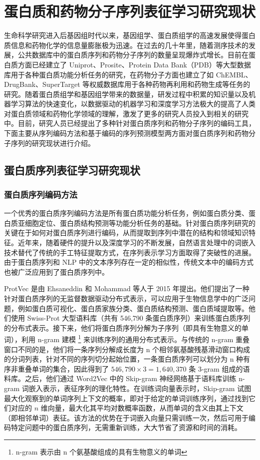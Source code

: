 
\chapter{蛋白质和药物分子序列表征学习研究现状}

生命科学研究进入后基因组时代以来，基因组学、蛋白质组学的高速发展使得蛋白质信息和药物化学的信息量膨胀极为迅速。在过去的几十年里，随着测序技术的发展，公共数据库中的蛋白质序列和药物分子序列的数量呈现爆炸式增长。目前在蛋白质方面已经建立了 Uniprot、Prosite、Protein Data Bank（PDB）等大型数据库用于各种蛋白质功能分析任务的研究，在药物分子方面也建立了如 ChEMBL、DrugBank、SuperTarget 等权威数据库用于各种药物再利用和药物生成等任务的研究。随着蛋白质组学和基因组学带来的数据量，研发过程中积累的知识量以及机器学习算法的快速变化，以数据驱动的机器学习和深度学习方法极大的提高了人类对蛋白质领域和药物化学领域的理解，激发了更多的研究人员投入到相关的研究中。目前，研究人员已经提出了多种针对蛋白质序列和药物分子序列的编码工具，下面主要从序列编码方法和基于编码的序列预测模型两方面对蛋白质序列和药物分子序列的研究现状进行介绍。

\section{蛋白质序列表征学习研究现状}

\subsection{蛋白质序列编码方法}
一个优秀的蛋白质序列编码方法是所有蛋白质功能分析任务，例如蛋白质分类、蛋白质亚细胞定位、蛋白质结构预测等功能分析任务的基础。针对蛋白质序列研究的关键在于如何对蛋白质序列进行编码，从而提取到序列中潜在的结构和领域知识特征。近年来，随着硬件的提升以及深度学习的不断发展，自然语言处理中的词嵌入技术替代了传统的手工特征提取方式，在序列表示学习方面取得了突破性的进展。由于蛋白质序列和 NLP 中的文本序列存在一定的相似性，传统文本中的编码方式也被广泛应用到了蛋白质序列中。

ProtVec \cite{asgari2015continuous} 是由 Ehsaneddin 和 Mohammad 等人于 2015 年提出。他们提出了一种针对蛋白质序列的无监督数据驱动分布式表示，可以应用于生物信息学中的广泛问题，例如蛋白质可视化、蛋白质家族分类、蛋白质结构预测、蛋白质域提取等。他们使用 Swiss-Prot 大型语料库（共有 546,790 条蛋白质序列）来训练蛋白质序列的分布式表示。接下来，他们将蛋白质序列分解为子序列（即具有生物意义的单词），利用 n-gram 建模 \footnote{n-gram 表示由 n 个氨基酸组成的具有生物意义的单词} 来训练序列的通用分布式表示。与传统的 n-gram 重叠窗口不同的是，他们将一条序列分解成长度为 n 个相邻氨基酸残基滑动窗口构成的分词列表，针对不同的序列切分起始位置，一条蛋白质序列可以划分为 n 种有序非重叠单词的集合，因此得到了 $546,790 \times 3 = 1,640,370$ 条 3-gram 组成的语料库。之后，他们通过 Word2Vec \cite{mikolov2013distributed} 中的 Skip-gram 神经网络基于语料库训练 n-gram 词嵌入表示，表征序列的理化特性。在训练词向量表示时，Skip-gram 试图最大化观察到的单词序列上下文的概率，即对于给定的单词训练序列，通过找到它们对应的 $n$ 维向量，最大化其平均对数概率函数，从而单词的含义由其上下文（即相邻单词）表征。该方法的优势在于词嵌入向量只需训练一次，然后可用于编码特定问题中的蛋白质序列，无需重新训练，大大节省了资源和时间的消耗。

